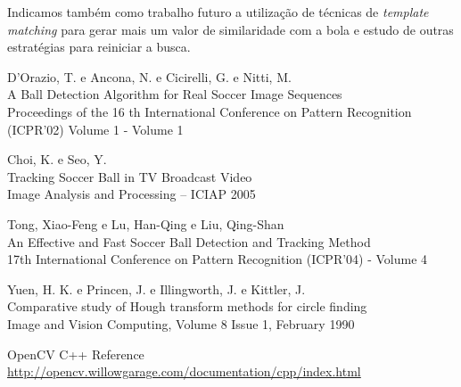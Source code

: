 \documentclass[11pt,a4paper]{article}
\begin{document}
 Indicamos também como trabalho futuro a utilização de técnicas de \textit{template matching} para gerar mais um valor de similaridade com a bola e estudo de outras estratégias para reiniciar a busca.

\begin{thebibliography}{99}

 D'Orazio, T. e Ancona, N. e Cicirelli, G. e Nitti, M.\\
 A Ball Detection Algorithm for Real Soccer Image Sequences\\
 Proceedings of the 16 th International Conference on Pattern Recognition (ICPR'02) Volume 1 - Volume 1

 Choi, K. e Seo, Y.\\
 Tracking Soccer Ball in TV Broadcast Video\\
 Image Analysis and Processing – ICIAP 2005

 Tong, Xiao-Feng e Lu, Han-Qing e Liu, Qing-Shan\\
 An Effective and Fast Soccer Ball Detection and Tracking Method\\
 17th International Conference on Pattern Recognition (ICPR'04) - Volume 4

 Yuen, H. K. e Princen, J. e Illingworth, J. e Kittler, J.\\
 Comparative study of Hough transform methods for circle finding\\
 Image and Vision Computing, Volume 8 Issue 1, February 1990 

 OpenCV C++ Reference\\
 \url{http://opencv.willowgarage.com/documentation/cpp/index.html}

\end{thebibliography}
\end{document}
